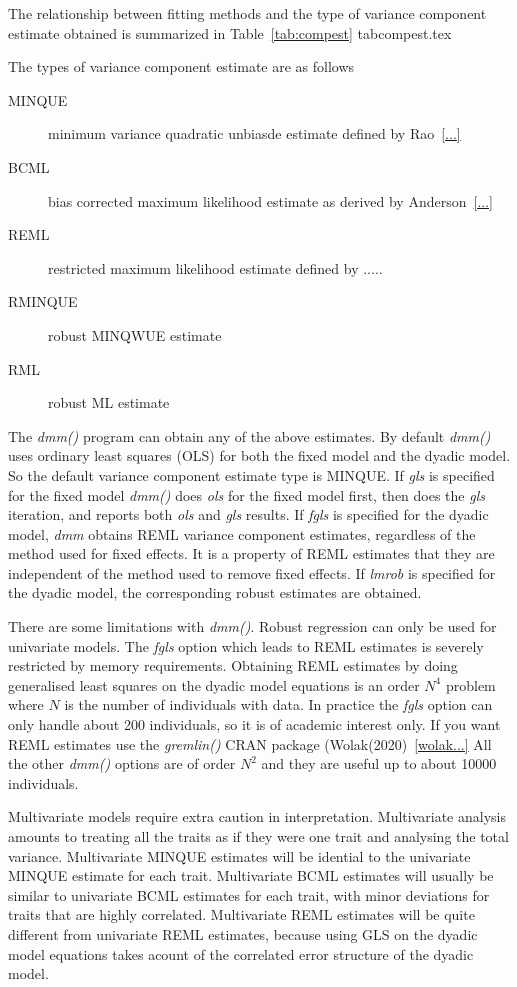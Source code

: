 \documentclass[titlepage]{article}  %
\begin{document}
The relationship between  fitting methods and the type of variance component estimate obtained is summarized in Table~\ref{tab:compest}
 {tabcompest.tex}

The types of variance component estimate are as follows
\begin{description}
\item[MINQUE] minimum variance quadratic unbiasde estimate defined by Rao~\ref{...}
\item[BCML] bias corrected maximum likelihood estimate as derived by Anderson~\ref{...}
\item[REML] restricted maximum likelihood estimate defined by .....
\item[RMINQUE] robust MINQWUE estimate
\item[RML] robust ML estimate
\end{description}

The {\em dmm()} program can obtain any of the above estimates. By default {\em dmm()} uses ordinary least squares (OLS) for both the fixed model and the dyadic model. So the default variance component estimate type is MINQUE. If {\em gls} is specified for the fixed model {\em dmm()} does {\em ols} for the fixed model first, then does the {\em gls} iteration, and reports both {\em ols} and {\em gls} results.  If {\em fgls} is specified for the dyadic model, {\em dmm} obtains REML variance component estimates, regardless of the method used for fixed effects. It is a property of REML estimates that they are independent of the method used to remove fixed effects. If {\em lmrob} is specified for the dyadic model, the corresponding robust estimates are obtained. 

There are some limitations with {\em dmm()}. Robust regression can only be used for univariate models. The {\em fgls} option which leads to REML estimates is severely restricted by memory requirements. Obtaining REML estimates by doing generalised least squares on the dyadic model equations is an order $N^{4}$ problem where $N$ is the number of individuals with data.  In practice the {\em fgls} option can only handle about 200 individuals, so it is of academic interest only. If you want REML estimates use the {\em gremlin()} CRAN package (Wolak(2020)~\ref{wolak...} All the other {\em dmm()} options are of order $N^{2}$ and they are useful up to about 10000 individuals.

Multivariate models require extra caution in interpretation. Multivariate analysis amounts to treating all the traits as if they were one trait and analysing the total variance. Multivariate MINQUE estimates will be idential to the univariate MINQUE estimate for each trait. Multivariate BCML estimates will usually be similar to univariate BCML estimates for each trait, with minor deviations for traits that are highly correlated. Multivariate REML estimates will be quite different from univariate REML estimates, because using GLS on the dyadic model equations takes acount of the correlated error structure of the dyadic model.
\end{document}
